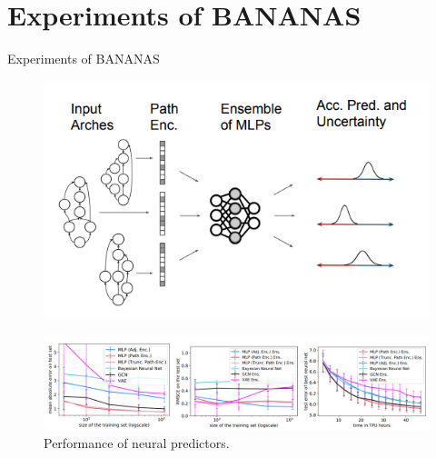 \documentclass{beamer}
\begin{document}
\section{Experiments of BANANAS}
\begin{frame}{Experiments of BANANAS}
    \begin{figure}
        \centering
        \includegraphics[scale=0.6]{images/bananas2.png}
    \end{figure}
    \begin{figure}
        \centering
        \includegraphics[scale=0.5]{images/bananas5.png}
        \caption{Performance of neural predictors.}
        \label{fig:enter-label}
    \end{figure}
\end{frame}
\end{document}

